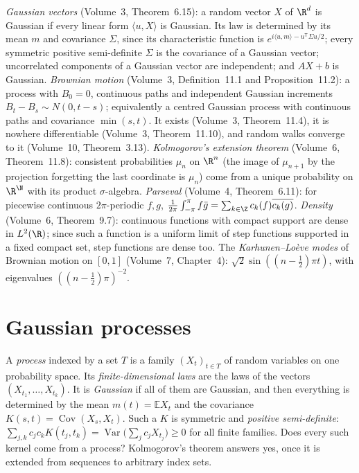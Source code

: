 \begin{reminder}
\emph{Gaussian vectors} (Volume~3, Theorem~6.15): a random vector $X$ of $\R^d$ is Gaussian if every linear form $\langle u,X\rangle$ is Gaussian. Its law is determined by its mean $m$ and covariance
$\Sigma$, since its characteristic function is $e^{i\langle u,m\rangle-u^{\mathsf T}\Sigma u/2}$; every symmetric positive semi-definite $\Sigma$ is the covariance of a Gaussian vector; uncorrelated components of a
Gaussian vector are independent; and $AX+b$ is Gaussian. \emph{Brownian motion} (Volume~3, Definition~11.1 and Proposition~11.2): a process with $B_0=0$, continuous paths and independent Gaussian increments
$B_t-B_s\sim N(0,t-s)$; equivalently a centred Gaussian process with continuous paths and covariance $\min(s,t)$. It exists (Volume~3, Theorem~11.4), it is nowhere differentiable (Volume~3,
Theorem~11.10), and random walks converge to it (Volume~10, Theorem~3.13). \emph{Kolmogorov's extension theorem} (Volume~6, Theorem~11.8): consistent probabilities $\mu_n$ on $\R^n$ (the image of
$\mu_{n+1}$ by the projection forgetting the last coordinate is $\mu_n$) come from a unique probability on $\R^\N$ with its product $\sigma$-algebra. \emph{Parseval} (Volume~4, Theorem~6.11): for
piecewise continuous $2\pi$-periodic $f,g$, $\frac1{2\pi}\int_{-\pi}^{\pi}f\bar g=\sum_{k\in\Z}c_k(f)\overline{c_k(g)}$. \emph{Density} (Volume~6, Theorem~9.7): continuous functions with compact support are dense in $L^2(\R)$; since such a function is a uniform limit of step functions supported in a fixed compact set,
step functions are dense too. The \emph{Karhunen--Lo\`eve modes} of Brownian motion on $[0,1]$ (Volume~7, Chapter~4): $\sqrt2\sin((n-\frac12)\pi t)$, with eigenvalues $((n-\frac12)\pi)^{-2}$.
\end{reminder}

\section{Gaussian processes}

A \emph{process} indexed by a set $T$ is a family $(X_t)_{t\in T}$ of random variables on one probability space. Its \emph{finite-dimensional laws} are the laws of the vectors $(X_{t_1},\dots,X_{t_k})$. It is
\emph{Gaussian} if all of them are Gaussian, and then everything is determined by the mean $m(t)=\mathbb E X_t$ and the covariance $K(s,t)=\operatorname{Cov}(X_s,X_t)$. Such a $K$ is symmetric and
\emph{positive semi-definite}: $\sum_{j,k}c_jc_kK(t_j,t_k)=\operatorname{Var}\bigl(\sum_jc_jX_{t_j}\bigr)\ge0$ for all finite families. Does every such kernel come from a process? Kolmogorov's theorem
answers yes, once it is extended from sequences to arbitrary index sets.

